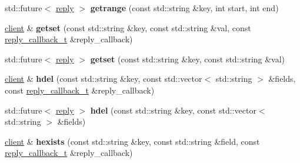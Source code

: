 \begin{DoxyCompactItemize}
\item 
\mbox{\label{classcpp__redis_1_1client_a3a0ed59f7fc32ba22c1a9be3c02e5468}} 
std\+::future$<$ \mbox{\hyperlink{classcpp__redis_1_1reply}{reply}} $>$ {\bfseries getrange} (const std\+::string \&key, int start, int end)
\item 
\mbox{\label{classcpp__redis_1_1client_a124dca021c3aedd3f8cbb52263e7fec8}} 
\mbox{\hyperlink{classcpp__redis_1_1client}{client}} \& {\bfseries getset} (const std\+::string \&key, const std\+::string \&val, const \mbox{\hyperlink{classcpp__redis_1_1client_af7a65eb21aa25230bfbb0b0203c4fc04}{reply\+\_\+callback\+\_\+t}} \&reply\+\_\+callback)
\item 
\mbox{\label{classcpp__redis_1_1client_abcbf060105acb8b1d7b14a5102be19a0}} 
std\+::future$<$ \mbox{\hyperlink{classcpp__redis_1_1reply}{reply}} $>$ {\bfseries getset} (const std\+::string \&key, const std\+::string \&val)
\item 
\mbox{\label{classcpp__redis_1_1client_adc62af1a2d07d04fbf274f98f374ab47}} 
\mbox{\hyperlink{classcpp__redis_1_1client}{client}} \& {\bfseries hdel} (const std\+::string \&key, const std\+::vector$<$ std\+::string $>$ \&fields, const \mbox{\hyperlink{classcpp__redis_1_1client_af7a65eb21aa25230bfbb0b0203c4fc04}{reply\+\_\+callback\+\_\+t}} \&reply\+\_\+callback)
\item 
\mbox{\label{classcpp__redis_1_1client_a56d4df4d31ffc56e097a8a78cb85d861}} 
std\+::future$<$ \mbox{\hyperlink{classcpp__redis_1_1reply}{reply}} $>$ {\bfseries hdel} (const std\+::string \&key, const std\+::vector$<$ std\+::string $>$ \&fields)
\item 
\mbox{\label{classcpp__redis_1_1client_a36aa37c50e8b5e44e17c4f1f0d2c656e}} 
\mbox{\hyperlink{classcpp__redis_1_1client}{client}} \& {\bfseries hexists} (const std\+::string \&key, const std\+::string \&field, const \mbox{\hyperlink{classcpp__redis_1_1client_af7a65eb21aa25230bfbb0b0203c4fc04}{reply\+\_\+callback\+\_\+t}} \&reply\+\_\+callback)
\item 
\mbox{\label{classcpp__redis_1_1client_a1fede52ba18414d75f37e776cc62b7f8}} 

\end{DoxyCompactItemize}

